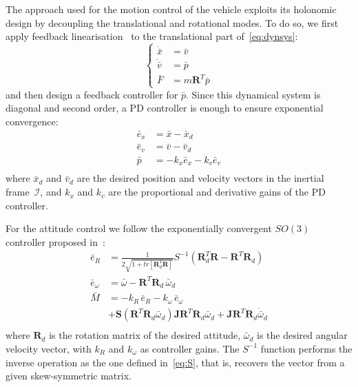 The approach used for the motion control of the vehicle exploits its
holonomic design by
decoupling the translational and rotational modes. To do so, we first
apply feedback linearisation~\cite{sastry99} to the translational part
of~\eqref{eq:dynsys}:
\begin{equation}
  \label{eq:fctrl}
    \left\{
    \begin{split}
      \dot{\bar{x}} &= \bar{v} \\
      \dot{\bar{v}} &= \bar{p} \\
      \bar{F} &= m \mathbf{R}^T \bar{p}
    \end{split}
  \right.
\end{equation}
and then design a feedback controller for $\bar{p}$. Since this
dynamical system is diagonal and second order, a PD controller is
enough to ensure exponential
convergence:
\begin{equation}
  \label{eq:pctrl}
  \begin{split}
    \bar{e}_x &= \bar{x} - \bar{x}_d \\
    \bar{e}_v &= \bar{v} - \bar{v}_d \\
    \bar{p} &= -k_x \bar{e}_x -k_v \bar{e}_v \\
  \end{split}
\end{equation}
where $\bar{x}_d$ and $\bar{v}_d$ are the desired position and
velocity vectors in the inertial frame~$\mathcal{I}$, and $k_x$ and
$k_v$ are the proportional and derivative gains of the PD controller.

For the attitude control we follow the exponentially convergent $SO(3)$ controller
proposed in~\cite{lee12}:
\begin{equation}
  \label{eq:mctrl}
  \begin{aligned}
    \bar{e}_R &= \frac{1}{2 \sqrt{1+tr[\mathbf{R}^T_d\mathbf{R}]} } S^{-1}( \mathbf{R}^T_d \mathbf{R} -
    \mathbf{R}^T \mathbf{R}_d ) \\
    \bar{e}_\omega &= \bar{\omega} - \mathbf{R}^T
    \mathbf{R}_d\,\bar{\omega}_d \\
    \bar{M} &= -k_R\,\bar{e}_R - k_\omega\,\bar{e}_\omega \\
    &+\mathbf{S}(\mathbf{R}^T\mathbf{R}_d\bar{\omega}_d)\mathbf{J}\mathbf{R}^T\mathbf{R}_d\bar{\omega}_d 
    +\mathbf{J}\mathbf{R}^T\mathbf{R}_d\dot{\bar{\omega}}_d \\
  \end{aligned}
\end{equation}
where $\mathbf{R}_d$ is the rotation matrix of the desired attitude,
$\bar{\omega}_d$ is the desired angular velocity vector, with $k_R$ and
$k_\omega$ as controller gains. The $S^{-1}$ function performs the inverse
operation as the one defined in~\eqref{eq:S}, that is, recovers
the vector from a given skew-symmetric matrix.


